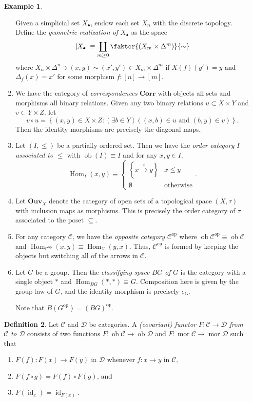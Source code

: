 \documentclass[10pt,letterpaper,cm]{nupset}
\theoremstyle{definition}
\newtheorem{definition}{Definition}[subsection]
\newtheorem{exmp}[definition]{Example}
\theoremstyle{theorem}
\theoremstyle{remark}
\newcommand{\1}{\mathbf{1}}
\renewcommand{\c}{\mathscr{C}}
\renewcommand{\d}{\mathscr{D}}
\newcommand{\0}{\vec 0}
\DeclareMathOperator{\id}{\mathrm{id}}
\DeclareMathOperator{\op}{op}
\DeclareMathOperator{\mor}{mor}
\DeclareMathOperator{\ob}{ob}
\DeclareMathOperator{\Hom}{Hom}
\begin{document}
\begin{exmp}
\begin{enumerate}
Given a simplicial set $X_{\bullet}$, endow each set $X_n$ with the discrete topology. Define the \textit{geometric realization of $X_{\bullet}$} as the space $$\lvert{X_{\bullet}}\rvert \equiv \coprod_{m\geq 0} \faktor{(X_m \times \Delta^m)}{\sim}$$ where $X_n \times \Delta^n \ni \left(x, y\right)\sim \left(x', y'\right) \in X_m \times \Delta^m$ if $X(f)(y') = y$ and $\Delta_f(x) = x'$ for some morphism $f: [n] \to [m]$.  
\item  We have the category of  \textit{correspondences} $\mathbf{Corr}$ with objects all sets and morphisms all binary relations. Given any two binary relations $u\subset X\times Y$ and $v \subset Y \times Z$, let
 $$v \circ u = \left\{(x, y) \in X \times Z : \left(\exists b \in Y\right)\left((x, b) \in u \text{ and }(b, y) \in v\right)\right\}.$$ Then the identity morphisms are precisely the diagonal maps.
\item Let $\left(I, \leq \right)$ be a partially ordered set. Then we have the \textit{order category $I$ associated to $\leq$} with $\ob(I) \equiv I$ and for any $x,y\in I$,
\[
\Hom_I(x,y) \equiv 
\begin{cases} 
\left\{x\overset{i}{\rightarrow} y\right\} & x\leq y
\\ \emptyset & \text{otherwise}
\end{cases}.
\]
\item Let $\mathbf{Ouv}_X$ denote the category of open sets of a topological space $\left(X, \tau\right)$ with inclusion maps as morphisms.
 This is precisely the order category of $\tau$ associated to the poset $\subseteq$. 
 \item For any category $\c$, we have the \textit{opposite category $\c^{\op}$} where $\ob{\c^{\op}} \equiv \ob{\c}$ and $\Hom_{\c^{\op}}(x,y) \equiv \Hom_{\c}(y,x)$. Thus, $\c^{\op}$ is formed by keeping the objects but switching all of the arrows in $\c$.
\item Let $G$ be a group. Then the \textit{classifying space $B{G}$ of $G$} is the category with a single object $\ast$ and $\Hom_{B{G}}(\ast, \ast) \equiv G$. Composition here is given by the group law of $G$, and the identity morphism is precisely $e_G$. 

Note that $B\left(G^{\op}\right) =\left(BG\right)^{\op}$.
\end{enumerate}
\end{exmp}

\begin{definition}\label{funct}
Let $\c$ and $\d$ be categories. A \textit{(covariant) functor $F: \c \to \d$ from $\c$ to $\d$} consists of two functions $F: \ob{\c} \to \ob{\d}$ and $F: \mor{\c} \to \mor{\d}$ such that 
\begin{enumerate}[label=(\roman*)]
\item $F(f) : F(x) \to F(y)$ in $\d$ whenever $f: x \to y$ in $\c$,
\item $F(f \circ g) = F(f) \circ F(g)$, and 
\item $F(\id_x) = \id_{F(x)}$.
\end{enumerate}
\end{definition}
\end{document}
